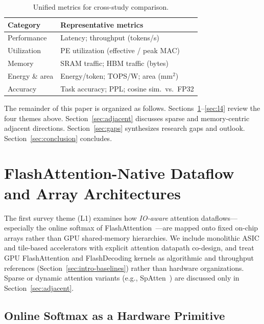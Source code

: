 \documentclass[conference]{IEEEtran}
\begin{document}
\begin{table}[t]
\caption{Unified metrics for cross-study comparison.}
\label{tab:metrics}
\centering
\small
\begin{tabular}{@{}l l@{}}
\hline
\textbf{Category} & \textbf{Representative metrics} \\
\hline
Performance & Latency; throughput (tokens/s) \\
Utilization & PE utilization (effective / peak MAC) \\
Memory & SRAM traffic; HBM traffic (bytes) \\
Energy \& area & Energy/token; TOPS/W; area (mm$^2$) \\
Accuracy & Task accuracy; PPL; cosine sim.\ vs.\ FP32 \\
\hline
\end{tabular}
\end{table}

The remainder of this paper is organized as follows.
Sections~\ref{sec:l1}--\ref{sec:l4} review the four themes above.
Section~\ref{sec:adjacent} discusses sparse and memory-centric adjacent directions.
Section~\ref{sec:gaps} synthesizes research gaps and outlook.
Section~\ref{sec:conclusion} concludes.

\section{FlashAttention-Native Dataflow and Array Architectures}
\label{sec:l1}

The first survey theme (L1) examines how \emph{IO-aware} attention dataflows---especially the online softmax of FlashAttention~\cite{dao2022flashattention,dao2023flashattention2,shah2024flashattention3}---are mapped onto fixed on-chip arrays rather than GPU shared-memory hierarchies.
We include monolithic ASIC and tile-based accelerators with explicit attention datapath co-design, and treat GPU FlashAttention and FlashDecoding kernels as algorithmic and throughput references (Section~\ref{sec:intro-baselines}) rather than hardware organizations.
Sparse or dynamic attention variants (e.g., SpAtten~\cite{wang2021spatten}) are discussed only in Section~\ref{sec:adjacent}.

\subsection{Online Softmax as a Hardware Primitive}
\label{sec:l1-online}
\end{document}
